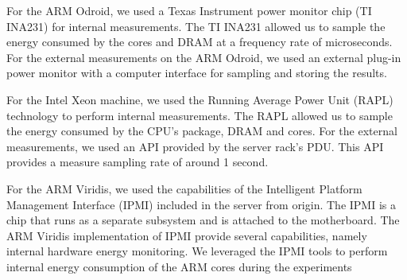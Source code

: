 For the ARM Odroid, we used a Texas Instrument power monitor chip (TI INA231) for internal measurements. The TI INA231 allowed us to sample the energy consumed by the cores and DRAM at a frequency rate of microseconds. For the external measurements on the ARM Odroid, we used an external plug-in power monitor with a computer interface for sampling and storing the results.

For the Intel Xeon machine, we used the Running Average Power Unit (RAPL) technology to perform internal measurements. The RAPL allowed us to sample the energy consumed by the CPU's package, DRAM and cores. For the external measurements, we used an API provided by the server rack's PDU. This API provides a measure sampling rate of around 1 second. 

For the ARM Viridis, we used the capabilities of the Intelligent Platform Management Interface (IPMI) \cite{IPMI} included in the server from origin. The IPMI is a chip that runs as a separate subsystem and is attached to the motherboard. The ARM Viridis implementation of IPMI provide several capabilities, namely internal hardware energy monitoring. We leveraged the IPMI tools to perform internal energy consumption of the ARM cores during the experiments



